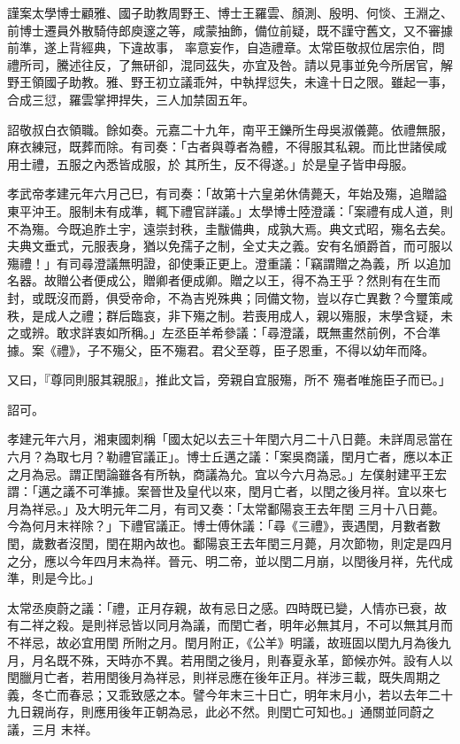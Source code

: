 \begin{pinyinscope}
 謹案太學博士顧雅、國子助教周野王、博士王羅雲、顏測、殷明、何惔、王淵之、前博士遷員外散騎侍郎庾邃之等，咸蒙抽飾，備位前疑，既不謹守舊文，又不審據前準，遂上背經典，下違故事，
 率意妄作，自造禮章。太常臣敬叔位居宗伯，問禮所司，騰述往反，了無研卻，混同茲失，亦宜及咎。請以見事並免今所居官，解野王領國子助教。雅、野王初立議乖舛，中執捍愆失，未違十日之限。雖起一事，合成三愆，羅雲掌押捍失，三人加禁固五年。



 詔敬叔白衣領職。餘如奏。元嘉二十九年，南平王鑠所生母吳淑儀薨。依禮無服，麻衣練冠，既葬而除。有司奏：「古者與尊者為體，不得服其私親。而比世諸侯咸用士禮，五服之內悉皆成服，於
 其所生，反不得遂。」於是皇子皆申母服。



 孝武帝孝建元年六月己巳，有司奏：「故第十六皇弟休倩薨夭，年始及殤，追贈謚東平沖王。服制未有成準，輒下禮官詳議。」太學博士陸澄議：「案禮有成人道，則不為殤。今既追胙土宇，遠崇封秩，圭黻備典，成孰大焉。典文式昭，殤名去矣。夫典文垂式，元服表身，猶以免孺子之制，全丈夫之義。安有名頒爵首，而可服以殤禮！」有司尋澄議無明證，卻使秉正更上。澄重議：「竊謂贈之為義，所
 以追加名器。故贈公者便成公，贈卿者便成卿。贈之以王，得不為王乎？然則有在生而封，或既沒而爵，俱受帝命，不為吉兇殊典；同備文物，豈以存亡異數？今璽策咸秩，是成人之禮；群后臨哀，非下殤之制。若喪用成人，親以殤服，末學含疑，未之或辨。敢求詳衷如所稱。」左丞臣羊希參議：「尋澄議，既無畫然前例，不合準據。案《禮》，子不殤父，臣不殤君。君父至尊，臣子恩重，不得以幼年而降。



 又曰，『尊同則服其親服』，推此文旨，旁親自宜服殤，所不
 殤者唯施臣子而已。」



 詔可。



 孝建元年六月，湘東國刺稱「國太妃以去三十年閏六月二十八日薨。未詳周忌當在六月？為取七月？勒禮官議正」。博士丘邁之議：「案吳商議，閏月亡者，應以本正之月為忌。謂正閏論雖各有所執，商議為允。宜以今六月為忌。」左僕射建平王宏謂：「邁之議不可準據。案晉世及皇代以來，閏月亡者，以閏之後月祥。宜以來七月為祥忌。」及大明元年二月，有司又奏：「太常鄱陽哀王去年閏
 三月十八日薨。今為何月末祥除？」下禮官議正。博士傅休議：「尋《三禮》，喪遇閏，月數者數閏，歲數者沒閏，閏在期內故也。鄱陽哀王去年閏三月薨，月次節物，則定是四月之分，應以今年四月末為祥。晉元、明二帝，並以閏二月崩，以閏後月祥，先代成準，則是今比。」



 太常丞庾蔚之議：「禮，正月存親，故有忌日之感。四時既已變，人情亦已衰，故有二祥之殺。是則祥忌皆以同月為議，而閏亡者，明年必無其月，不可以無其月而不祥忌，故必宜用閏
 所附之月。閏月附正，《公羊》明議，故班固以閏九月為後九月，月名既不殊，天時亦不異。若用閏之後月，則春夏永革，節候亦舛。設有人以閏臘月亡者，若用閏後月為祥忌，則祥忌應在後年正月。祥涉三載，既失周期之義，冬亡而春忌；又乖致感之本。譬今年末三十日亡，明年末月小，若以去年二十九日親尚存，則應用後年正朝為忌，此必不然。則閏亡可知也。」通關並同蔚之議，三月
 末祥。




\end{pinyinscope}
